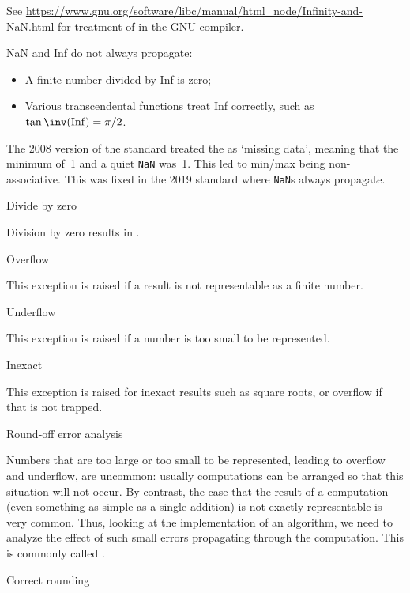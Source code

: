   See \url{https://www.gnu.org/software/libc/manual/html_node/Infinity-and-NaN.html}
  for treatment of  in the GNU compiler.

\begin{remark}
  NaN and Inf do not always propagate:
  \begin{itemize}
  \item A finite number divided by Inf is zero;
  \item Various transcendental functions treat Inf correctly,
    such as $\tan\inv(\mathrm{Inf})=\pi/2$.
  \end{itemize}

  The 2008 version of the standard treated the 
  as `missing data', meaning that the minimum of~1 and a quiet \lstinline{NaN} was~1.
  This led to min/max being non-associative. This was fixed in the 2019 standard
  where \lstinline{NaN}s always propagate.
\end{remark}


 {Divide by zero}

Division by zero results in .

 {Overflow}

This exception is raised if a result is not representable
as a finite number.

 {Underflow}

This exception is raised if a number is too small to be represented.

 {Inexact}

This exception is raised for inexact results such as square roots,
or overflow if that is not trapped.

 {Round-off error analysis}
\label{sec:roundoff}

Numbers that are too large or too small to be represented, leading to
overflow and underflow, are
uncommon: usually computations can be arranged so that this situation
will not occur. By contrast, the case that the result of a computation
(even something as simple as a single addition) 
is not exactly representable is very common.
Thus, looking at the
implementation of an algorithm, we need to analyze the
effect of such small errors propagating through the computation.
This is commonly called
.

 {Correct rounding}
\label{sec:correct-round}

